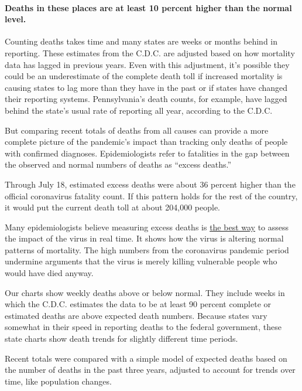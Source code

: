 \hypertarget{deaths-in-these-places-are-at-least-10-percent-higher-than-the-normal-level}{%
\paragraph{Deaths in these places are at least 10 percent higher than
the normal
level.}\label{deaths-in-these-places-are-at-least-10-percent-higher-than-the-normal-level}}

Counting deaths takes time and many states are weeks or months behind in
reporting. These estimates from the C.D.C. are adjusted based on how
mortality data has lagged in previous years. Even with this adjustment,
it's possible they could be an underestimate of the complete death toll
if increased mortality is causing states to lag more than they have in
the past or if states have changed their reporting systems.
Pennsylvania's death counts, for example, have lagged behind the state's
usual rate of reporting all year, according to the C.D.C.

But comparing recent totals of deaths from all causes can provide a more
complete picture of the pandemic's impact than tracking only deaths of
people with confirmed diagnoses. Epidemiologists refer to fatalities in
the gap between the observed and normal numbers of deaths as ``excess
deaths.''

Through July 18, estimated excess deaths were about 36 percent higher
than the official coronavirus fatality count. If this pattern holds for
the rest of the country, it would put the current death toll at about
204,000 people.

Many epidemiologists believe measuring excess deaths is
\href{https://www.thelancet.com/journals/lancet/article/PIIS0140-6736(20)30933-8/fulltext}{the
best way} to assess the impact of the virus in real time. It shows how
the virus is altering normal patterns of mortality. The high numbers
from the coronavirus pandemic period undermine arguments that the virus
is merely killing vulnerable people who would have died anyway.

Our charts show weekly deaths above or below normal. They include weeks
in which the C.D.C. estimates the data to be at least 90 percent
complete or estimated deaths are above expected death numbers. Because
states vary somewhat in their speed in reporting deaths to the federal
government, these state charts show death trends for slightly different
time periods.

Recent totals were compared with a simple model of expected deaths based
on the number of deaths in the past three years, adjusted to account for
trends over time, like population changes.

